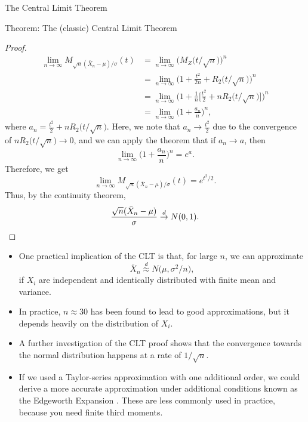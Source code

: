 \begin{frame}[allowframebreaks]{The Central Limit Theorem}
\begin{block}{Theorem: The (classic) Central Limit Theorem}
{\begin{proof}
\begin{align*}
        \lim_{n\rightarrow \infty} M_{\sqrt{n}(\bar{X}_n - \mu) / \sigma}(t) &= \lim_{n\rightarrow\infty} \Big(M_{Z}\big(t/\sqrt{n}\big)\Big)^n \\
        &= \lim_{n\rightarrow \infty} \Big(1 + \frac{t^2}{2n} + R_2\big(t/\sqrt{n}\big)\Big)^n \\
        &= \lim_{n\rightarrow \infty} \Big(1 + \frac{1}{n}\Big[\frac{t^2}{2} + nR_2\big(t/\sqrt{n}\big)\Big]\Big)^n \\
        &= \lim_{n\rightarrow \infty} \Big(1 + \frac{a_n}{n}\Big)^n,
      \end{align*}
      where $a_n = \frac{t^2}{2} + nR_2\big(t/\sqrt{n}\big)$. Here, we note that $a_n \rightarrow \frac{t^2}{2}$ due to the convergence of $nR_2\big(t/\sqrt{n}\big)\rightarrow 0$, and we can apply the theorem \citep[e.g., Lemma~2.3.14 of][]{casella24} that if $a_n \rightarrow a$, then
      $$
      \lim_{n\rightarrow \infty}\Big(1 + \frac{a_n}{n}\Big)^n = e^a.
      $$
      Therefore, we get
      $$
      \lim_{n\rightarrow \infty} M_{\sqrt{n}(\bar{X}_n - \mu) / \sigma}(t) = e^{t^2/2}.
      $$
      Thus, by the continuity theorem,
      $$
      \frac{\sqrt{n}(\bar{X}_n - \mu)}{\sigma} \overset{d}{\rightarrow} N(0, 1).
      $$
    \end{proof}
    }
    
  \end{block}
  
  \framebreak
  
  \begin{itemize}
    \item One practical implication of the CLT is that, for large $n$, we can approximate
    $$
    \bar{X}_n \overset{d}{\approx} N\big(\mu, \sigma^2/n\big),
    $$
    if $X_i$ are independent and identically distributed with finite mean and variance.
    \item In practice, $n\approx 30$ has been found to lead to good approximations, but it depends heavily on the distribution of $X_i$. 
    \item A further investigation of the CLT proof shows that the convergence towards the normal distribution happens at a rate of $1/\sqrt{n}$.
    \item If we used a Taylor-series approximation with one additional order, we could derive a more accurate approximation under additional conditions known as the Edgeworth Expansion \citep[See Theorem~19.3 of][]{keener10}.
    These are less commonly used in practice, because you need finite third moments.
  \end{itemize}
  

\end{frame}
